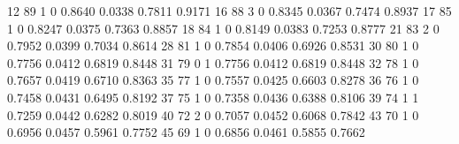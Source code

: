 \documentclass[
  12pt,
  letterpaper,
  DIV=11,
  numbers=noendperiod,
  onepage,
  openany]{scrreprt}
\newenvironment{Shaded}{\begin{snugshade}}{\end{snugshade}}
\newcommand{\DecValTok}[1]{\textcolor[rgb]{0.86,0.86,0.80}{#1}}
\newcommand{\FloatTok}[1]{\textcolor[rgb]{0.75,0.75,0.82}{#1}}
\begin{document}
\begin{Shaded}
\begin{Highlighting}[]
    \DecValTok{12}       \DecValTok{89}      \DecValTok{1}      \DecValTok{0}             \FloatTok{0.8640}    \FloatTok{0.0338}     \FloatTok{0.7811}    \FloatTok{0.9171}
    \DecValTok{16}       \DecValTok{88}      \DecValTok{3}      \DecValTok{0}             \FloatTok{0.8345}    \FloatTok{0.0367}     \FloatTok{0.7474}    \FloatTok{0.8937}
    \DecValTok{17}       \DecValTok{85}      \DecValTok{1}      \DecValTok{0}             \FloatTok{0.8247}    \FloatTok{0.0375}     \FloatTok{0.7363}    \FloatTok{0.8857}
    \DecValTok{18}       \DecValTok{84}      \DecValTok{1}      \DecValTok{0}             \FloatTok{0.8149}    \FloatTok{0.0383}     \FloatTok{0.7253}    \FloatTok{0.8777}
    \DecValTok{21}       \DecValTok{83}      \DecValTok{2}      \DecValTok{0}             \FloatTok{0.7952}    \FloatTok{0.0399}     \FloatTok{0.7034}    \FloatTok{0.8614}
    \DecValTok{28}       \DecValTok{81}      \DecValTok{1}      \DecValTok{0}             \FloatTok{0.7854}    \FloatTok{0.0406}     \FloatTok{0.6926}    \FloatTok{0.8531}
    \DecValTok{30}       \DecValTok{80}      \DecValTok{1}      \DecValTok{0}             \FloatTok{0.7756}    \FloatTok{0.0412}     \FloatTok{0.6819}    \FloatTok{0.8448}
    \DecValTok{31}       \DecValTok{79}      \DecValTok{0}      \DecValTok{1}             \FloatTok{0.7756}    \FloatTok{0.0412}     \FloatTok{0.6819}    \FloatTok{0.8448}
    \DecValTok{32}       \DecValTok{78}      \DecValTok{1}      \DecValTok{0}             \FloatTok{0.7657}    \FloatTok{0.0419}     \FloatTok{0.6710}    \FloatTok{0.8363}
    \DecValTok{35}       \DecValTok{77}      \DecValTok{1}      \DecValTok{0}             \FloatTok{0.7557}    \FloatTok{0.0425}     \FloatTok{0.6603}    \FloatTok{0.8278}
    \DecValTok{36}       \DecValTok{76}      \DecValTok{1}      \DecValTok{0}             \FloatTok{0.7458}    \FloatTok{0.0431}     \FloatTok{0.6495}    \FloatTok{0.8192}
    \DecValTok{37}       \DecValTok{75}      \DecValTok{1}      \DecValTok{0}             \FloatTok{0.7358}    \FloatTok{0.0436}     \FloatTok{0.6388}    \FloatTok{0.8106}
    \DecValTok{39}       \DecValTok{74}      \DecValTok{1}      \DecValTok{1}             \FloatTok{0.7259}    \FloatTok{0.0442}     \FloatTok{0.6282}    \FloatTok{0.8019}
    \DecValTok{40}       \DecValTok{72}      \DecValTok{2}      \DecValTok{0}             \FloatTok{0.7057}    \FloatTok{0.0452}     \FloatTok{0.6068}    \FloatTok{0.7842}
    \DecValTok{43}       \DecValTok{70}      \DecValTok{1}      \DecValTok{0}             \FloatTok{0.6956}    \FloatTok{0.0457}     \FloatTok{0.5961}    \FloatTok{0.7752}
    \DecValTok{45}       \DecValTok{69}      \DecValTok{1}      \DecValTok{0}             \FloatTok{0.6856}    \FloatTok{0.0461}     \FloatTok{0.5855}    \FloatTok{0.7662}

\end{Highlighting}
\end{Shaded}
\end{document}
